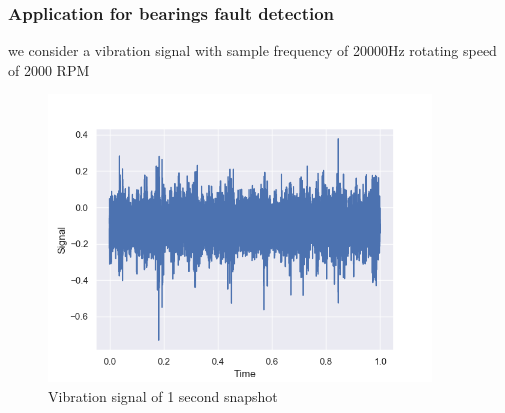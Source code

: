 \documentclass[11pt, oneside]{article}   	%
\begin{document}
\subsubsection{Application for bearings fault detection}
we consider a vibration signal with sample frequency of 20000Hz rotating speed of 2000 RPM
\begin{figure}[H] %
   \centering
   \includegraphics[width=4in]{signal} 
   \caption{Vibration signal of 1 second snapshot}
   \label{fig:signal}
\end{figure}
\end{document}
